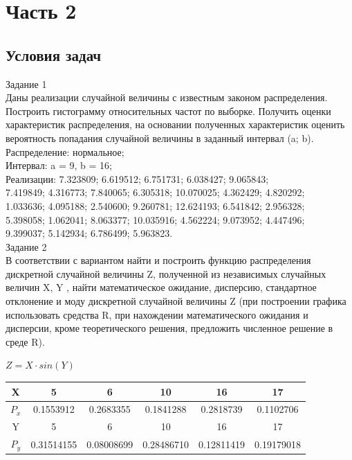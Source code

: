 \newpage
\section{Часть 2}
\subsection{Условия задач}
Задание 1\\

Даны реализации случайной величины с известным законом распределения. Построить гистограмму относительных частот по выборке. Получить оценки характеристик распределения, на основании полученных характеристик оценить вероятность попадания случайной величины в заданный интервал (a; b).\\


Распределение: нормальное;\\
Интервал: a = 9, b = 16;\\
Реализации: 7.323809; 6.619512; 6.751731; 6.038427; 9.065843;\\
7.419849; 4.316773; 7.840065; 6.305318; 10.070025; 4.362429; 4.820292;\\
1.033636; 4.095188; 2.540600; 9.260781; 12.624193; 6.541842; 2.956328;\\
5.398058; 1.062041; 8.063377; 10.035916; 4.562224; 9.073952; 4.447496;\\
9.399037; 5.142934; 6.786499; 5.963823.\\


Задание 2\\

В соответствии с вариантом найти и построить функцию
распределения дискретной случайной величины Z, полученной
из независимых случайных величин X, Y , найти математическое
ожидание, дисперсию, стандартное отклонение и моду дискретной случайной величины Z (при построении графика использовать средства R, при нахождении математического ожидания и
дисперсии, кроме теоретического решения, предложить численное решение в среде R).\\

 \begin{center}
 $Z = X\cdot sin(Y)$\\
 \end{center}


\begin{table}[!h]
\centering
\label{my-label}
\begin{tabular}{|c|c|c|c|c|c|}
\hline
X     & 5          & 6          & 10         & 16         & 17         \\ \hline
$P_x$ & 0.1553912  & 0.2683355  & 0.1841288  & 0.2818739  & 0.1102706  \\ \hline
Y     & 5          & 6          & 10         & 16         & 17         \\ \hline
$P_y$ & 0.31514155 & 0.08008699 & 0.28486710 & 0.12811419 & 0.19179018 \\ \hline
\end{tabular}
\end{table}
\newpage
